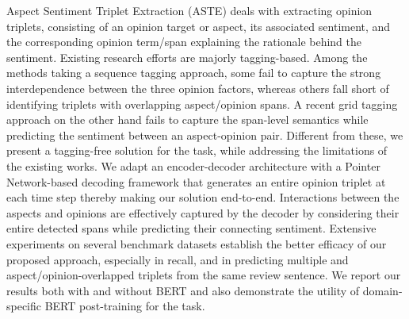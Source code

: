 Aspect Sentiment Triplet Extraction (ASTE) deals with extracting opinion triplets, consisting of an opinion target or aspect, its associated sentiment, and the corresponding opinion term/span explaining the rationale behind the sentiment. Existing research efforts are majorly tagging-based. Among the methods taking a sequence tagging approach, some fail to capture the strong interdependence between the three opinion factors, whereas others fall short of identifying triplets with overlapping aspect/opinion spans. A recent grid tagging approach on the other hand fails to capture the span-level semantics while predicting the sentiment between an aspect-opinion pair. Different from these, we present a tagging-free solution for the task, while addressing the limitations of the existing works. We adapt an encoder-decoder architecture with a Pointer Network-based decoding framework that generates an entire opinion triplet at each time step thereby making our solution end-to-end. Interactions between the aspects and opinions are effectively captured by the decoder by considering their entire detected spans while predicting their connecting sentiment. Extensive experiments on several benchmark datasets establish the better efficacy of our proposed approach, especially in recall, and in predicting multiple and aspect/opinion-overlapped triplets from the same review sentence. We report our results both with and without BERT and also demonstrate the utility of domain-specific BERT post-training for the task.
